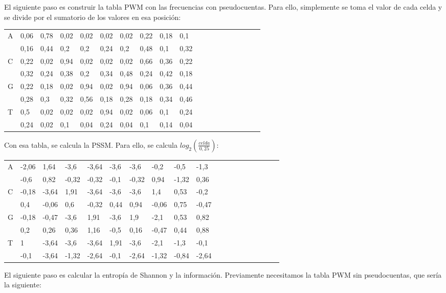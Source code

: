 El siguiente paso es construir la tabla PWM con las frecuencias con pseudocuentas. Para ello, simplemente se toma el valor de cada celda y se divide por el sumatorio de los valores en esa posición: 
\begin{table}[htbp]
\begin{tabular}{l | llllllllllllllllll}
A & 0,06 & 0,78 & 0,02 & 0,02 & 0,02 & 0,02 & 0,22 & 0,18 & 0,1  \\
& 0,16 & 0,44 & 0,2  & 0,2  & 0,24 & 0,2  & 0,48 & 0,1  & 0,32 \\
C & 0,22 & 0,02 & 0,94 & 0,02 & 0,02 & 0,02 & 0,66 & 0,36 & 0,22 \\
& 0,32 & 0,24 & 0,38 & 0,2  & 0,34 & 0,48 & 0,24 & 0,42 & 0,18 \\
G & 0,22 & 0,18 & 0,02 & 0,94 & 0,02 & 0,94 & 0,06 & 0,36 & 0,44 \\
& 0,28 & 0,3  & 0,32 & 0,56 & 0,18 & 0,28 & 0,18 & 0,34 & 0,46 \\
T & 0,5  & 0,02 & 0,02 & 0,02 & 0,94 & 0,02 & 0,06 & 0,1  & 0,24 \\
& 0,24 & 0,02 & 0,1  & 0,04 & 0,24 & 0,04 & 0,1  & 0,14 & 0,04
\end{tabular}
\end{table}
\newpage
Con esa tabla, se calcula la PSSM. Para ello, se calcula $log_2(\frac{celda}{0,25})$:
\begin{table}[htbp]
\begin{tabular}{l | llllllllllllllllll}
A & -2,06 & 1,64  & -3,6 & -3,64 & -3,6 & -3,6 & -0,2 & -0,5 & -1,3 \\
& -0,6 & 0,82  & -0,32 & -0,32 & -0,1 & -0,32 & 0,94  & -1,32 & 0,36  \\
C & -0,18 & -3,64 & 1,91 & -3,64 & -3,6 & -3,6 & 1,4  & 0,53 & -0,2 \\
& 0,4  & -0,06 & 0,6   & -0,32 & 0,44 & 0,94  & -0,06 & 0,75  & -0,47 \\
G & -0,18 & -0,47 & -3,6 & 1,91  & -3,6 & 1,9  & -2,1 & 0,53 & 0,82 \\
& 0,2  & 0,26  & 0,36  & 1,16  & -0,5 & 0,16  & -0,47 & 0,44  & 0,88  \\
T & 1  & -3,64 & -3,6 & -3,64 & 1,91 & -3,6 & -2,1 & -1,3 & -0,1 \\
& -0,1 & -3,64 & -1,32 & -2,64 & -0,1 & -2,64 & -1,32 & -0,84 & -2,64
\end{tabular}
\end{table}

El siguiente paso es calcular la entropía de Shannon y la información. Previamente necesitamos la tabla PWM sin pseudocuentas, que sería la siguiente:

